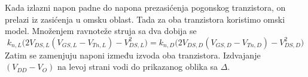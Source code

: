 Kada izlazni napon padne do napona prezasićenja pogonskog tranzistora, on prelazi iz zasićenja u omsku oblast. Tada za oba tranzistora koristimo omski model. Množenjem ravnoteže struja sa dva dobija se
\[k_{n,L}\bigl(2V_{DS,L}(V_{GS,L}-V_{Tn,L})-V_{DS,L}^2\bigr)=k_{n,D}\bigl(2V_{DS,D}(V_{GS,D}-V_{Tn,D})-V_{DS,D}^2\bigr)\]
Zatim se zamenjuju naponi između izvoda oba tranzistora. Izdvajanje $(V_{DD}-V_O)$ na levoj strani vodi do prikazanog oblika sa $\Delta$.
